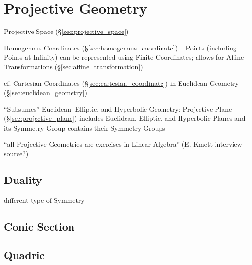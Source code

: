 \section{Projective Geometry}\label{sec:projective_geometry}

Projective Space (\S\ref{sec:projective_space})

Homogenous Coordinates (\S\ref{sec:homogenous_coordinate}) -- Points
(including Points at Infinity) can be represented using Finite
Coordinates; allows for Affine Transformations
(\S\ref{sec:affine_transformation})

cf. Cartesian Coordinates (\S\ref{sec:cartesian_coordinate}) in
Euclidean Geometry (\S\ref{sec:euclidean_geometry})

``Subsumes'' Euclidean, Elliptic, and Hyperbolic Geometry: Projective
Plane (\S\ref{sec:projective_plane}) includes Euclidean, Elliptic, and
Hyperbolic Planes and its Symmetry Group contains their Symmetry
Groups

``all Projective Geometries are exercises in Linear Algebra'' (E.
Kmett interview -- source?) %



\subsection{Duality}\label{sec:projective_duality}

different type of Symmetry %



\subsection{Conic Section}\label{sec:conic_section}

\subsection{Quadric}\label{sec:quadric}



